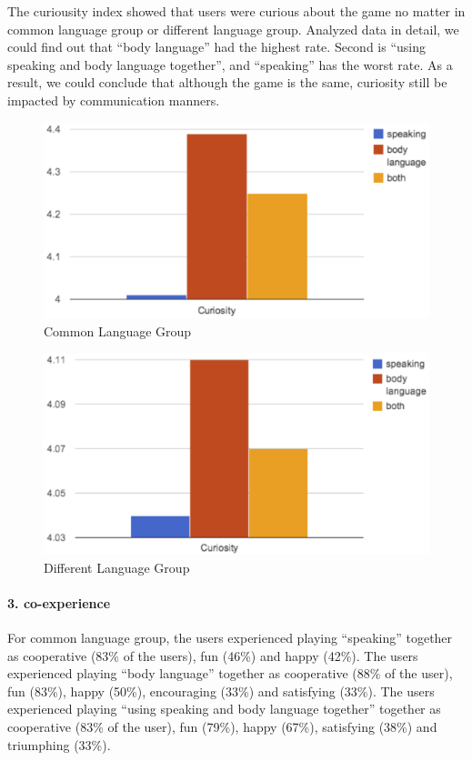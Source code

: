 The curiousity index showed that users were curious about the game no matter in common language group or different language group. Analyzed data in detail, we could find out that ``body language'' had the highest rate. Second is ``using speaking and body language together'', and ``speaking'' has the worst rate. As a result, we could conclude that although the game is the same, curiosity still be impacted by communication manners.

\begin{figure}[!h]
\centering
\includegraphics[width=0.9\columnwidth]{Figures/US_Curi_Com.png}
\caption{Common Language Group}
\label{fig:US_Curi_Com}
\end{figure}

\begin{figure}[!h]
\centering
\includegraphics[width=0.9\columnwidth]{Figures/US_Curi_Dif.png}
\caption{Different Language Group}
\label{fig:US_Curi_Dif}
\end{figure}


\paragraph{3. co-experience}

For common language group, the users experienced playing ``speaking'' together as cooperative (83\% of the users), fun (46\%) and happy (42\%). The users experienced playing ``body language'' together as cooperative (88\% of the user), fun (83\%), happy (50\%), encouraging (33\%) and satisfying (33\%). The users experienced playing ``using speaking and body language together'' together as cooperative (83\% of the user), fun (79\%), happy (67\%), satisfying (38\%) and triumphing (33\%).

